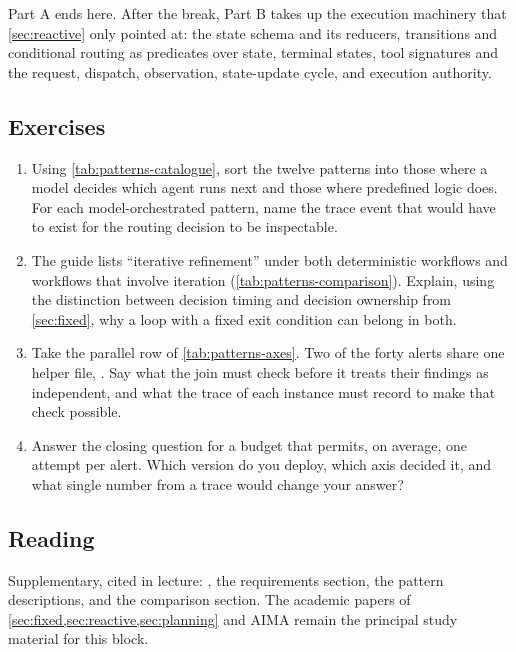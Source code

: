 Part A ends here. After the break, Part B takes up the execution machinery that
\cref{sec:reactive} only pointed at: the state schema and its reducers, transitions and
conditional routing as predicates over state, terminal states, tool signatures and the
request, dispatch, observation, state-update cycle, and execution authority.

\subsection{Exercises}

\begin{enumerate}
  \item Using \cref{tab:patterns-catalogue}, sort the twelve patterns into those where a
  model decides which agent runs next and those where predefined logic does. For each
  model-orchestrated pattern, name the trace event that would have to exist for the
  routing decision to be inspectable.
  \item The guide lists ``iterative refinement'' under both deterministic workflows and
  workflows that involve iteration (\cref{tab:patterns-comparison}). Explain, using the
  distinction between decision timing and decision ownership from \cref{sec:fixed}, why
  a loop with a fixed exit condition can belong in both.
  \item Take the parallel row of \cref{tab:patterns-axes}. Two of the forty alerts share
  one helper file, . Say what the join must check
  before it treats their findings as independent, and what the trace of each instance must
  record to make that check possible.
  \item Answer the closing question for a budget that permits, on average, one attempt per
  alert. Which version do you deploy, which axis decided it, and what single number from
  a trace would change your answer?
\end{enumerate}

\subsection{Reading}

Supplementary, cited in lecture: \citet{google2026patterns}, the requirements section, the
pattern descriptions, and the comparison section. The academic papers of
\cref{sec:fixed,sec:reactive,sec:planning} and AIMA remain the
principal study material for this block.
